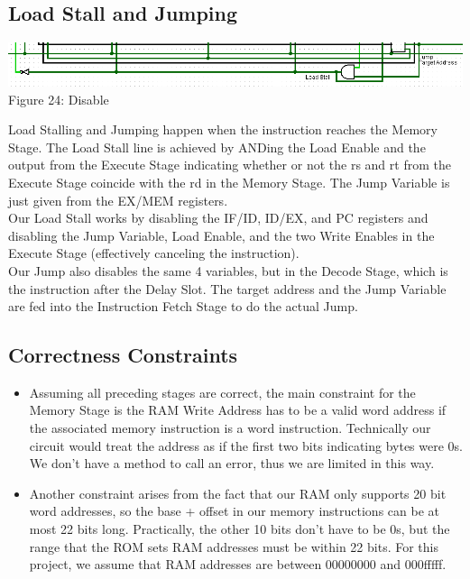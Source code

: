 \documentclass{article}
\begin{document}
\vspace{1cm}

\subsection{Load Stall and Jumping}
\begin{center}
\includegraphics[width=.9\textwidth]{Disable.png} \\
Figure 24: Disable
\end{center}
Load Stalling and Jumping happen when the instruction reaches the Memory Stage. The Load Stall line is achieved by ANDing the Load Enable and the output from the Execute Stage indicating whether or not the rs and rt from the Execute Stage coincide with the rd in the Memory Stage. The Jump Variable is just given from the EX/MEM registers. \\
Our Load Stall works by disabling the IF/ID, ID/EX, and PC registers and disabling the Jump Variable, Load Enable, and the two Write Enables in the Execute Stage (effectively canceling the instruction). \\
Our Jump also disables the same 4 variables, but in the Decode Stage, which is the instruction after the Delay Slot. The target address and the Jump Variable are fed into the Instruction Fetch Stage to do the actual Jump.

\subsection{Correctness Constraints}
\begin{itemize}
\item
Assuming all preceding stages are correct, the main constraint for the Memory Stage is the RAM Write Address has to be a valid word address if the associated memory instruction is a word instruction. Technically our circuit would treat the address as if the first two bits indicating bytes were 0s. We don't have a method to call an error, thus we are limited in this way.
\item
Another constraint arises from the fact that our RAM only supports 20 bit word addresses, so the base + offset in our memory instructions can be at most 22 bits long. Practically, the other 10 bits don't have to be 0s, but the range that the ROM sets RAM addresses must be within 22 bits. For this project, we assume that RAM addresses are between 00000000 and 000fffff. 
\end{itemize}
\end{document}
